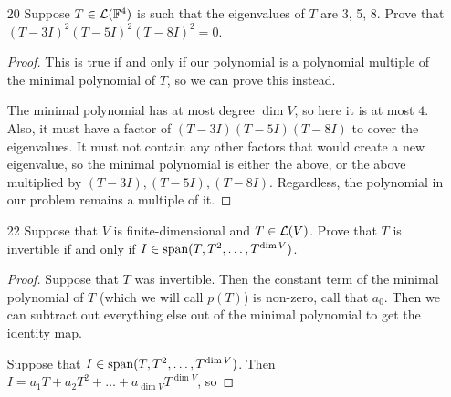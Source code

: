 \begin{enumerate}
\begin{proof}
        \begin{align*}
            Ie_0 &= e_0 \\
            Te_0 &= e_1 \\
            \vdots \\
            T^{n - 1}e_0 &= e_{n - 1} \\
            T^n &= (-a_0, -a_1, \dots, -a_{n-1}) 
        \end{align*}

        Since for the $i$th basis vector, the only 2 items in this list that can touch it are $T^i v$ and $T^n v$, finding each coefficient, given that the coefficient of $T^n v$ is 1, is easy.

        $$T^n + a_{n - 1}T^{n-1} + \dots + a_0T^0 = 0$$

        So we are done.
    \end{proof}

    \item[20] Suppose $T \in \mathcal L(\mathbb{F}^4)$ is such that the eigenvalues of $T$ are 3, 5, 8. Prove that $(T - 3I)^2(T - 5I)^2(T - 8I)^2 = 0$.
    
    \begin{proof}
        This is true if and only if our polynomial is a polynomial multiple of the minimal polynomial of $T$, so we can prove this instead. 

        The minimal polynomial has at most degree $\dim V$, so here it is at most $4$. Also, it must have a factor of $(T - 3I)(T - 5I)(T - 8I)$ to cover the eigenvalues. It must not contain any other factors that would create a new eigenvalue, so the minimal polynomial is either the above, or the above multiplied by $(T - 3I), (T - 5I), (T - 8I)$. Regardless, the polynomial in our problem remains a multiple of it.
    \end{proof}

    \item[22] Suppose that $V$ is finite-dimensional and $T \in \mathcal L(V)$. Prove that $T$ is invertible if and only if $I \in \text{span}(T, T^2, \dots, T^{\dim V})$.
    
    \begin{proof}
        Suppose that $T$ was invertible. Then the constant term of the minimal polynomial of $T$ (which we will call $p(T)$) is non-zero, call that $a_0$. Then we can subtract out everything else out of the minimal polynomial to get the identity map.

        Suppose that $I \in \text{span}(T, T^2, \dots, T^{\dim V})$. Then $I = a_1T + a_2T^2 + \dots + a_{\dim V}T^{\dim V}$, so 


\end{proof}
\end{enumerate}
